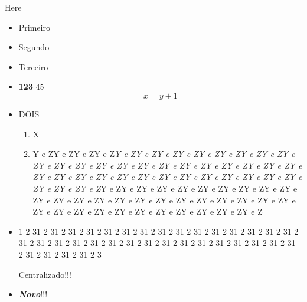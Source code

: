 \documentclass{article}
\begin{document}
Here

\begin{itemize}[label = $\triangleright$]
    \item Primeiro
    \item Segundo
    \item Terceiro
    \item \textbf{123} 45 \[ x = y + 1\]
    \item DOIS
        \begin{enumerate}
            \item X
            \item Y e ZY e ZY e ZY e Z\textit{Y e ZY e ZY e ZY e ZY e ZY e ZY e ZY e ZY e ZY e ZY e ZY e ZY e ZY e ZY e ZY e ZY e ZY e ZY e ZY e ZY e ZY e ZY e ZY e ZY e ZY e ZY e ZY e ZY e ZY e ZY e ZY e ZY e ZY e ZY e ZY e ZY e ZY e Z}Y e ZY e ZY e ZY e ZY e ZY e ZY e ZY e ZY e ZY e ZY e ZY e ZY e ZY e ZY e ZY e ZY e ZY e ZY e ZY e ZY e ZY e ZY e ZY e ZY e ZY e ZY e ZY e ZY e ZY e ZY e ZY e ZY e ZY e Z
        \end{enumerate}
    \item 1 2      31 2      31 2      31 2      31 2      31 2      31 2      31 2      31 2      31 2      31 2      31 2      31 2      31 2      31 2      31 2      31 2      31 2      31 2      31 2      31 2      31 2      31 2      31 2      31 2      31 2      31 2      31 2      31 2      31 2      31 2      31 2      31 2      31 2      31 2      31 2      3
        \begin{center}
            Centralizado!!!
        \end{center}
    \item \textbf{\textit{Novo}}!!!
\end{itemize}
\end{document}

